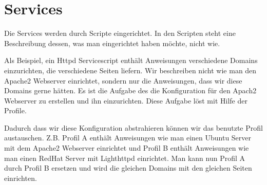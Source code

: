 \section{Services}

Die Services werden durch Scripte eingerichtet. In den Scripten steht eine
Beschreibung dessen, was man eingerichtet haben möchte, nicht wie. 

Als Beispiel,
ein Httpd Servicescript enthält Anweisungen verschiedene Domains einzurichten,
die verschiedene Seiten liefern. Wir beschreiben nicht wie man den Apache2
Webserver einrichtet, sondern nur die Anweisungen, dass wir diese Domains gerne
hätten. Es ist die Aufgabe des \sscontrol{} die Konfiguration für den Apach2
Webserver zu erstellen und ihn einzurichten. Diese Aufgabe löst \sscontrol{} mit
Hilfe der Profile.

Dadurch dass wir diese Konfiguration abstrahieren können wir das benutzte Profil
austauschen. Z.B. Profil A enthält Anweisungen wie man einen Ubuntu Server mit
dem Apache2 Webserver einrichtet und Profil B enthält Anweisungen wie man einen
RedHat Server mit Lighthttpd einrichtet. Man kann nun Profil A durch Profil B
ersetzen und \sscontrol{} wird die gleichen Domains mit den gleichen Seiten
einrichten.






